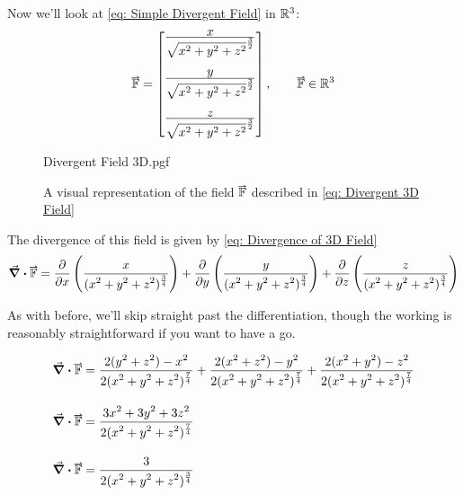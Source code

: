 \documentclass[main.tex]{subfiles}
\begin{document}
                    \newpage
                    Now we'll look at \eqref{eq: Simple Divergent Field} in $\mathbb{R}^3$:
                    \begin{equation}
                        \vect{\mathbb{F}} = \Matrix{\bfrac{x}{\sqrt{x^2 + y^2 + z^2}^\frac{3}{2}}\\[2em] \bfrac{y}{\sqrt{x^2 + y^2 + z^2}^\frac{3}{2}}\\[2em]\bfrac{z}{\sqrt{x^2 + y^2 + z^2}^\frac{3}{2}}}, \hspace{2em} \vect{\mathbb{F}} \in \Reals^3
                        \label{eq: Divergent 3D Field}
                    \end{equation}


                    \begin{figure}[h]
                        \centering
                        \scalebox{1}
                        {
                            \begin{adjustbox}{clip,trim=10mm 20mm 10mm 10mm}
                                {{Divergent Field 3D.pgf}}
                            \end{adjustbox}
                        }
                        \caption{A visual representation of the field $\protect\vect{\mathbb{F}}$ described in \eqref{eq: Divergent 3D Field}}
                        \label{fig: Divergent 3D Field}
                    \end{figure}
                    \FloatBarrier
                    \vspace{2em}


                    The divergence of this field is given by \eqref{eq: Divergence of 3D Field}
                    \begin{equation}
                        \div{\vect{\mathbb{F}}} = \frac{\partial}{\partial x}\left(\bfrac{x}{(x^2 + y^2 + z^2)^\frac{3}{4}}\right) + \frac{\partial}{\partial y}\left(\bfrac{y}{(x^2 + y^2 + z^2)^\frac{3}{4}}\right) + \frac{\partial}{\partial z}\left(\bfrac{z}{(x^2 + y^2 + z^2)^\frac{3}{4}}\right)
                        \label{eq: Divergence of 3D Field}
                    \end{equation}

                    \newpage
                    As with before, we'll skip straight past the differentiation, though the working is reasonably straightforward if you want to have a go.

                    \begin{align}
                        \div{\vect{\mathbb{F}}} &= \bfrac{2(y^2 + z^2) - x^2}{2(x^2 + y^2 +z^2)^\frac{7}{4}} + \bfrac{2(x^2 + z^2) - y^2}{2(x^2 + y^2 +z^2)^\frac{7}{4}} + \bfrac{2(x^2 + y^2) - z^2}{2(x^2 + y^2 +z^2)^\frac{7}{4}} \nonumber\\[1em]
                        \div{\vect{\mathbb{F}}} &= \bfrac{3x^2 + 3y^2 + 3z^2}{2(x^2 + y^2 +z^2)^\frac{7}{4}}\nonumber\\[1em]
                        \div{\vect{\mathbb{F}}} &=\bfrac{3}{2(x^2 + y^2 +z^2)^\frac{3}{4}} \label{eq: Divergence of 3D Field example}
                    \end{align}
\end{document}
